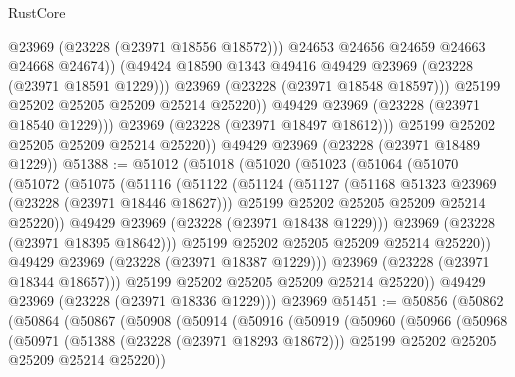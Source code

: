 \begin{lexlean}{RustCore}
\begin{coremodule}
                        @23969
                        (@23228 (@23971 @18556 @18572)))
                      @24653
                      @24656
                      @24659
                      @24663
                      @24668
                      @24674))
                  (@49424 @18590 @1343 @49416 @49429 @23969 (@23228 (@23971 @18591 @1229)))
                  @23969
                  (@23228 (@23971 @18548 @18597)))
                @25199
                @25202
                @25205
                @25209
                @25214
                @25220))
            @49429
            @23969
            (@23228 (@23971 @18540 @1229)))
          @23969
          (@23228 (@23971 @18497 @18612)))
        @25199
        @25202
        @25205
        @25209
        @25214
        @25220))
    @49429
    @23969
    (@23228 (@23971 @18489 @1229))
@51388 := @51012
    (@51018
      (@51020
        (@51023
          (@51064
            (@51070
              (@51072
                (@51075
                  (@51116
                    (@51122
                      (@51124
                        (@51127
                          (@51168 @51323 @23969 (@23228 (@23971 @18446 @18627)))
                          @25199
                          @25202
                          @25205
                          @25209
                          @25214
                          @25220))
                      @49429
                      @23969
                      (@23228 (@23971 @18438 @1229)))
                    @23969
                    (@23228 (@23971 @18395 @18642)))
                  @25199
                  @25202
                  @25205
                  @25209
                  @25214
                  @25220))
              @49429
              @23969
              (@23228 (@23971 @18387 @1229)))
            @23969
            (@23228 (@23971 @18344 @18657)))
          @25199
          @25202
          @25205
          @25209
          @25214
          @25220))
      @49429
      @23969
      (@23228 (@23971 @18336 @1229)))
    @23969
@51451 := @50856
    (@50862
      (@50864
        (@50867
          (@50908
            (@50914
              (@50916
                (@50919
                  (@50960
                    (@50966
                      (@50968
                        (@50971
                          (@51388 (@23228 (@23971 @18293 @18672)))
                          @25199
                          @25202
                          @25205
                          @25209
                          @25214
                          @25220))

\end{coremodule}
\end{lexlean}
